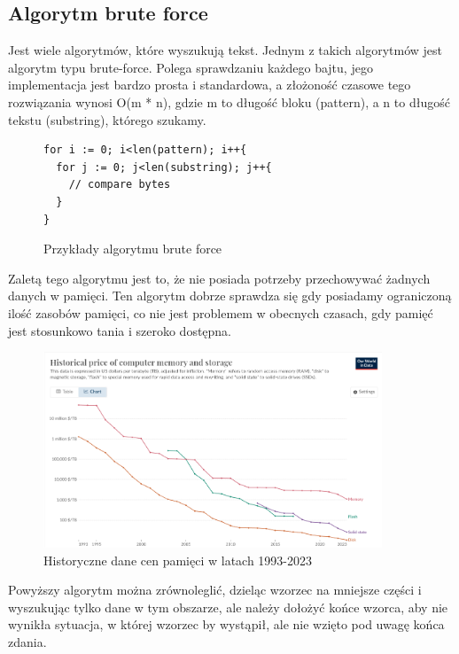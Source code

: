 \subsection{Algorytm brute force}

Jest wiele algorytmów, które wyszukują tekst. Jednym z takich algorytmów jest 
algorytm typu brute-force. Polega sprawdzaniu każdego bajtu, jego implementacja
jest bardzo prosta i standardowa, a złożoność czasowe tego rozwiązania wynosi
O(m * n), gdzie m to długość bloku (pattern), a n to długość tekstu (substring),
którego szukamy. 

\begin{figure}[h]
  \centering
  \begin{lstlisting}
for i := 0; i<len(pattern); i++{
  for j := 0; j<len(substring); j++{
    // compare bytes
  }
}
  \end{lstlisting}
  \caption{Przykłady algorytmu brute force}
  \label{fig:code:bruteForceComparison}
\end{figure}

Zaletą tego algorytmu jest to, że nie posiada potrzeby przechowywać żadnych 
danych w pamięci. Ten algorytm dobrze sprawdza się gdy posiadamy ograniczoną 
ilość zasobów pamięci, co nie jest problemem w obecnych czasach, gdy pamięć jest
stosunkowo tania i szeroko dostępna.
\begin{figure}[h]
  \centering
  \includegraphics[width=0.9\textwidth]{./images/historical-mem-price.png}
  \caption{Historyczne dane cen pamięci w latach 1993-2023 }
  \label{screenshot:MemPrices}
\end{figure}

Powyższy algorytm można zrównoleglić, dzieląc wzorzec na mniejsze części
i wyszukując tylko dane w tym obszarze, ale należy dołożyć końce wzorca, aby nie
wynikła sytuacja, w której wzorzec by wystąpił, ale nie wzięto pod uwagę końca 
zdania. 

